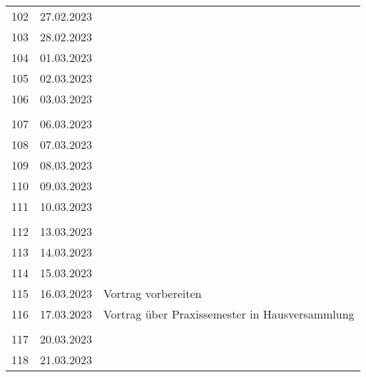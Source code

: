 \begin{longtable}{|l|c|l|}
&               &                                                       \\ \hline  
102 & 27.02.2023    &                                                       \\ \hline 
103 & 28.02.2023    &                                                       \\ \hline 
104 & 01.03.2023    &                                                       \\ \hline 
105 & 02.03.2023    &                                                       \\ \hline 
106 & 03.03.2023    &                                                       \\ \hline
&               &                                                       \\ \hline  
107 & 06.03.2023    &                                                       \\ \hline
108 & 07.03.2023    &                                                       \\ \hline
109 & 08.03.2023    &                                                       \\ \hline
110 & 09.03.2023    &                                                       \\ \hline
111 & 10.03.2023    &                                                       \\ \hline
&               &                                                       \\ \hline 
112 & 13.03.2023    &                                                       \\ \hline
113 & 14.03.2023    &                                                       \\ \hline
114 & 15.03.2023    &                                                       \\ \hline
115 & 16.03.2023    &  Vortrag vorbereiten                                                     \\ \hline
116 & 17.03.2023    &  Vortrag über Praxissemester in Hausversammlung                                                     \\ \hline
&               &                                                       \\ \hline 
117 & 20.03.2023    &                                                       \\ \hline
118 & 21.03.2023    &                                                       \\ \hline

\end{longtable}

